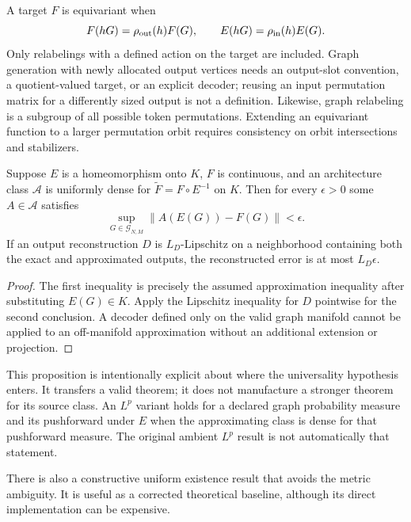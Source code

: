A target $F$ is equivariant when
\[
 F(hG)=\rho_{\rm out}(h)F(G),\qquad
 E(hG)=\rho_{\rm in}(h)E(G).
\]
Only relabelings with a defined action on the target are included. Graph generation with newly allocated output vertices needs an output-slot convention, a quotient-valued target, or an explicit decoder; reusing an input permutation matrix for a differently sized output is not a definition. Likewise, graph relabeling is a subgroup of all possible token permutations. Extending an equivariant function to a larger permutation orbit requires consistency on orbit intersections and stabilizers.

\begin{proposition}
Suppose $E$ is a homeomorphism onto $K$, $F$ is continuous, and an architecture class $\mathcal A$ is uniformly dense for $\widetilde F=F\circ E^{-1}$ on $K$. Then for every $\epsilon>0$ some $A\in\mathcal A$ satisfies
\[
 \sup_{G\in\mathcal G_{N,M}}\|A(E(G))-F(G)\|<\epsilon.
\]
If an output reconstruction $D$ is $L_D$-Lipschitz on a neighborhood containing both the exact and approximated outputs, the reconstructed error is at most $L_D\epsilon$.
\end{proposition}
\begin{proof}
The first inequality is precisely the assumed approximation inequality after substituting $E(G)\in K$. Apply the Lipschitz inequality for $D$ pointwise for the second conclusion. A decoder defined only on the valid graph manifold cannot be applied to an off-manifold approximation without an additional extension or projection.
\end{proof}

This proposition is intentionally explicit about where the universality hypothesis enters. It transfers a valid theorem; it does not manufacture a stronger theorem for its source class. An $L^p$ variant holds for a declared graph probability measure and its pushforward under $E$ when the approximating class is dense for that pushforward measure. The original ambient $L^p$ result is not automatically that statement.

There is also a constructive uniform existence result that avoids the metric ambiguity. It is useful as a corrected theoretical baseline, although its direct implementation can be expensive.

